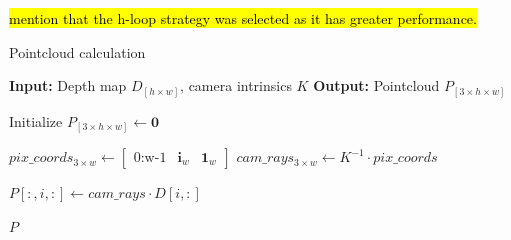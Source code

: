 \hl{mention that the h-loop strategy was selected as it has greater performance.}

\begin{algorithm}
    \caption{Pointcloud calculation}
    \label{algorithm:scene_pcd_hloop}
    \footnotesize

    \begin{algorithmic}[1]
        \State \textbf{Input:} Depth map $D_{\left[h \times w\right]}$, camera intrinsics $K$ 
        \State \textbf{Output:} Pointcloud $P_{\left[3 \times h \times w\right]}$
        
        \State Initialize $P_{\left[3 \times h \times w\right]} \gets \mathbf{0}$

            \State $pix\_coords_{3 \times w} \gets \begin{bmatrix} \text{0:w-1} & \mathbf{i}_w & \mathbf{1}_w \end{bmatrix}$
            \State $cam\_rays_{3 \times w} \gets K^{-1} \cdot pix\_coords$
            
            \State $P[:, i, :] \gets cam\_rays \cdot D[i, :]$  
        \EndFor
        
        \State \Return $P$
    \end{algorithmic}
\end{algorithm}


